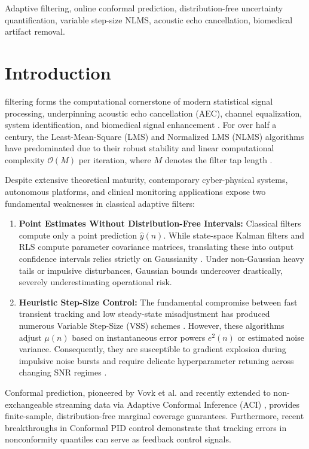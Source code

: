 \documentclass[journal,twocolumn]{IEEEtran}
\begin{document}
\begin{IEEEkeywords}
Adaptive filtering, online conformal prediction, distribution-free uncertainty quantification, variable step-size NLMS, acoustic echo cancellation, biomedical artifact removal.
\end{IEEEkeywords}

\section{Introduction}
 filtering forms the computational cornerstone of modern statistical signal processing, underpinning acoustic echo cancellation (AEC), channel equalization, system identification, and biomedical signal enhancement \cite{sayed2008adaptive, haykin2013adaptive}. For over half a century, the Least-Mean-Square (LMS) and Normalized LMS (NLMS) algorithms have predominated due to their robust stability and linear computational complexity $\mathcal{O}(M)$ per iteration, where $M$ denotes the filter tap length \cite{diniz2020adaptive}.

Despite extensive theoretical maturity, contemporary cyber-physical systems, autonomous platforms, and clinical monitoring applications expose two fundamental weaknesses in classical adaptive filters:
\begin{enumerate}
    \item \textbf{Point Estimates Without Distribution-Free Intervals:} Classical filters compute only a point prediction $\hat{y}(n)$. While state-space Kalman filters and RLS compute parameter covariance matrices, translating these into output confidence intervals relies strictly on Gaussianity \cite{sayed2008adaptive}. Under non-Gaussian heavy tails or impulsive disturbances, Gaussian bounds undercover drastically, severely underestimating operational risk.
    \item \textbf{Heuristic Step-Size Control:} The fundamental compromise between fast transient tracking and low steady-state misadjustment has produced numerous Variable Step-Size (VSS) schemes \cite{kwong1992variable, benesty2006nonparametric, rey2007variable}. However, these algorithms adjust $\mu(n)$ based on instantaneous error powers $e^2(n)$ or estimated noise variance. Consequently, they are susceptible to gradient explosion during impulsive noise bursts and require delicate hyperparameter retuning across changing SNR regimes \cite{chen2020maximum}.
\end{enumerate}

Conformal prediction, pioneered by Vovk et al. and recently extended to non-exchangeable streaming data via Adaptive Conformal Inference (ACI) \cite{gibbs2021adaptive, gibbs2024conformal}, provides finite-sample, distribution-free marginal coverage guarantees. Furthermore, recent breakthroughs in Conformal PID control \cite{angelopoulos2023conformal} demonstrate that tracking errors in nonconformity quantiles can serve as feedback control signals.
\end{document}
